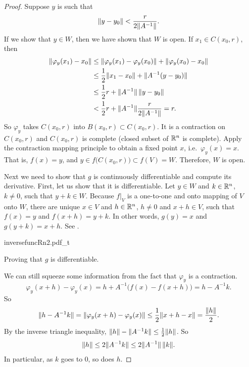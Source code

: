 \begin{proof}
Suppose $y$ is such that
\begin{equation*}
\lVert {y-y_0} \rVert <
\frac{r}{2\lVert {A^{-1}} \rVert} .
\end{equation*}
If we show that $y \in W$, then we have shown that $W$ is open.
If $x_1 \in
C(x_0,r)$, then
\begin{equation*}
\begin{split}
\lVert {\varphi_y(x_1)-x_0} \rVert
& \leq
\lVert {\varphi_y(x_1)-\varphi_y(x_0)} \rVert +
\lVert {\varphi_y(x_0)-x_0} \rVert \\
& \leq
\frac{1}{2}\lVert {x_1-x_0} \rVert +
\lVert {A^{-1}(y-y_0)} \rVert \\
& \leq
\frac{1}{2}r +
\lVert {A^{-1}} \rVert \, \lVert {y-y_0} \rVert \\
& <
\frac{1}{2}r +
\lVert {A^{-1}} \rVert
\frac{r}{2\lVert {A^{-1}} \rVert} = r .
\end{split}
\end{equation*}
So $\varphi_y$ takes $C(x_0,r)$ into $B(x_0,r) \subset C(x_0,r)$.  It is a
contraction on $C(x_0,r)$ and $C(x_0,r)$ is complete (closed subset of ${\mathbb{R}}^n$
is complete).
Apply the contraction mapping principle to obtain a fixed point $x$,
i.e.\ $\varphi_y(x) = x$.  That is, $f(x) = y$, and $y \in
f\bigl(C(x_0,r)\bigr) \subset f(V) = W$.  Therefore, $W$ is open.

Next we need to show that $g$ is continuously differentiable and compute
its derivative.  First, let us show that it is differentiable.
Let $y \in W$ and $k \in {\mathbb{R}}^n$, $k\not= 0$, such that $y+k \in W$.
Because $f|_V$ is a one-to-one and onto mapping of $V$ onto $W$,
there are unique
$x \in V$ and $h \in {\mathbb{R}}^n$, $h \not= 0$ and $x+h \in V$, such that
$f(x) = y$ and $f(x+h) = y+k$.
In other words, $g(y) = x$ and $g(y+k) = x+h$.  See
.
\begin{myfigureht}
{inversefuncRn2.pdf_t}
\caption{Proving that $g$ is differentiable.\label{fig:inversefuncRn2}}
\end{myfigureht}

We can still
squeeze some information from the fact that $\varphi_y$ is a contraction.
\begin{equation*}
\varphi_y(x+h)-\varphi_y(x) = h + A^{-1} \bigl( f(x)-f(x+h) \bigr) = h - A^{-1} k .
\end{equation*}
So
\begin{equation*}
\lVert {h-A^{-1}k} \rVert = \lVert {\varphi_y(x+h)-\varphi_y(x)} \rVert \leq
\frac{1}{2}\lVert {x+h-x} \rVert = \frac{\lVert {h} \rVert}{2}.
\end{equation*}
By the inverse triangle inequality, $\lVert {h} \rVert - \lVert {A^{-1}k} \rVert \leq
\frac{1}{2}\lVert {h} \rVert$.
So
\begin{equation*}
\lVert {h} \rVert \leq 2 \lVert {A^{-1}k} \rVert \leq 2 \lVert {A^{-1}} \rVert \, \lVert {k} \rVert.
\end{equation*}
In particular, as $k$ goes to 0, so does $h$.


\end{proof}
